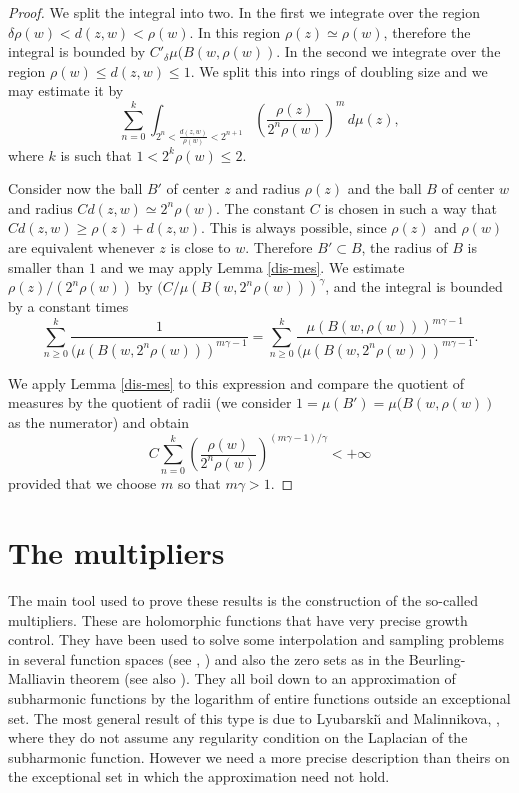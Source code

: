 \documentclass[12pt,twoside,final,psamsfonts]{amsart}
\theoremstyle{plain}
\theoremstyle{remark}
\theoremstyle{definition}
\begin{document}
\begin{proof}
We split the integral into two. In the first we integrate over the region
$\delta\rho(w)<\allowbreak d(z,w)<\rho(w)$. In this region $\rho(z)\simeq\rho(w)$,
therefore the integral is bounded by  
$C'_\delta\mu(B(w,\rho(w))$. In the second we integrate over the
region $\rho(w)\le d(z,w)\le 1$. 
We split this into rings of doubling size and we
may estimate it by
\[
\sum_{n=0}^k \int_{2^n<\frac{d(z,w)}{\rho(w)}<2^{n+1}}  \left(\frac{\rho(z)}
{2^n\rho(w)}\right)^m\, d\mu(z),
\]
where $k$ is such that $1<2^{k}\rho(w)\le 2$. 

Consider now the ball $B'$ of center $z$ and radius $\rho(z)$ and the ball $B$
of center $w$ and radius $C d(z,w)\simeq 2^n\rho(w)$. The constant $C$ is 
chosen
in such a way that $Cd(z,w)\ge \rho(z)+d(z,w)$. This is always possible,
since $\rho(z)$ and $\rho(w)$ are equivalent whenever $z$ is close to $w$.  
Therefore $B'\subset B$,
the radius of $B$ is smaller than $1$ and  we
may apply Lemma \ref{dis-mes}. We estimate $\rho(z)/(2^n\rho(w))$ by
$(C/\mu(B(w,2^n\rho(w)))^\gamma$, and the integral is bounded by a
constant times
\[
\sum_{n\ge 0}^k \frac{1}{(\mu(B(w,2^n\rho(w)))^{m\gamma-1}}=
\sum_{n\ge 0}^k \frac{\mu(B(w,\rho(w)))^{m\gamma -1}}
{(\mu(B(w,2^n\rho(w)))^{m\gamma-1}}.
\]

We apply Lemma \ref{dis-mes} to this expression and compare 
the quotient of measures by the quotient of radii (we consider
$1=\mu(B')=\mu(B(w,\rho(w))$ as the numerator) and obtain
\[
C\sum_{n=0}^k
\left(\frac{\rho(w)}{2^n\rho(w)}\right)^{(m\gamma-1)/\gamma}<+\infty
\]
provided that we choose $m$ so that $m\gamma>1$.
\end{proof}

\section{The multipliers}\label{multiplier}
The main tool used to prove these results is the construction of the so-called
multipliers. These are holomorphic functions that have very precise growth
control. They have been used to solve some interpolation and sampling 
problems in several function spaces (see \cite{OrtSei98}, \cite{LyuSei94}) and
also the zero sets as in the Beurling-Malliavin theorem  (see also
\cite{Seip95b}). They all boil down to an approximation of subharmonic
functions by the logarithm of entire functions outside an exceptional set. 
The most general result of this
type is due to Lyubarski{\u\i} and Malinnikova, \cite{LyuMal99}, 
where they do not assume any
regularity condition on the Laplacian of the subharmonic function. However
we need a more precise description than theirs on 
the exceptional set in which the approximation need not hold.
\end{document}
